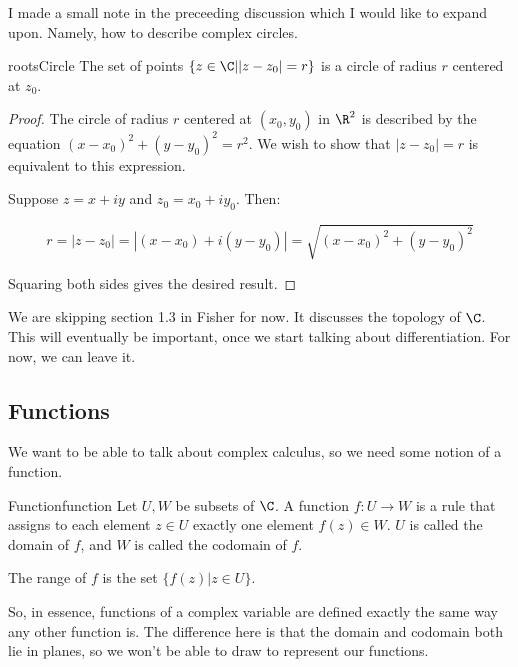 I made a small note in the preceeding discussion which I would like to expand upon. Namely, how to describe complex circles.

\begin{thmbo}{}{rootsCircle}
The set of points $\{z\in\C| |z - z_0| = r\}$ is a circle of radius $r$ centered at $z_0$.
\end{thmbo}

\begin{proof} The circle of radius $r$ centered at $(x_0,y_0)$ in $\R^2$ is described by the equation $(x-x_0)^2 + (y-y_0)^2 = r^2$. We wish to show that $|z-z_0| = r$ is equivalent to this expression.

Suppose $z = x + iy$ and $z_0 = x_0 + iy_0$. Then:

$$r = |z-z_0| = |(x-x_0) + i(y-y_0)| = \sqrt{(x-x_0)^2 + (y-y_0)^2}$$

Squaring both sides gives the desired result.
\end{proof}


\begin{note} We are skipping section 1.3 in Fisher for now. It discusses the topology of $\C$. This will eventually be important, once we start talking about differentiation. For now, we can leave it.\end{note}



\subsection{Functions}

We want to be able to talk about complex calculus, so we need some notion of a function. 

\begin{defbo}{Function}{function}
Let $U,W$ be subsets of $\C$. A function $f:U\rightarrow W$ is a rule that assigns to each element $z\in U$ exactly one element $f(z) \in W$. $U$ is called the domain of $f$, and $W$ is called the codomain of $f$.

The range of $f$ is the set $\{f(z)|z\in U\}$.
\end{defbo}

So, in essence, functions of a complex variable are defined exactly the same way any other function is. The difference here is that the domain and codomain both lie in planes, so we won't be able to draw to represent our functions.

